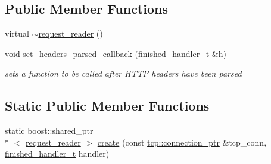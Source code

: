 \subsection*{Public Member Functions}
\begin{DoxyCompactItemize}
\item 
virtual \hyperlink{classpion_1_1http_1_1request__reader_af95b3b865d2476b18c8b662653d787fb}{$\sim$request\-\_\-reader} ()
\item 
void \hyperlink{classpion_1_1http_1_1request__reader_a858278778288495a8045bee27b2637ab}{set\-\_\-headers\-\_\-parsed\-\_\-callback} (\hyperlink{classpion_1_1http_1_1request__reader_a4cc323f3e852134f2ac785e51e1d623e}{finished\-\_\-handler\-\_\-t} \&h)
\begin{DoxyCompactList}\small\item\em sets a function to be called after H\-T\-T\-P headers have been parsed \end{DoxyCompactList}\end{DoxyCompactItemize}
\subsection*{Static Public Member Functions}
\begin{DoxyCompactItemize}
\item 
static boost\-::shared\-\_\-ptr\\*
$<$ \hyperlink{classpion_1_1http_1_1request__reader}{request\-\_\-reader} $>$ \hyperlink{classpion_1_1http_1_1request__reader_aea694c2bb305c40e7791462c25cdbd05}{create} (const \hyperlink{namespacepion_1_1tcp_a6c9b7497068009f6d81d95ec0b0627d6}{tcp\-::connection\-\_\-ptr} \&tcp\-\_\-conn, \hyperlink{classpion_1_1http_1_1request__reader_a4cc323f3e852134f2ac785e51e1d623e}{finished\-\_\-handler\-\_\-t} handler)
\end{DoxyCompactItemize}
